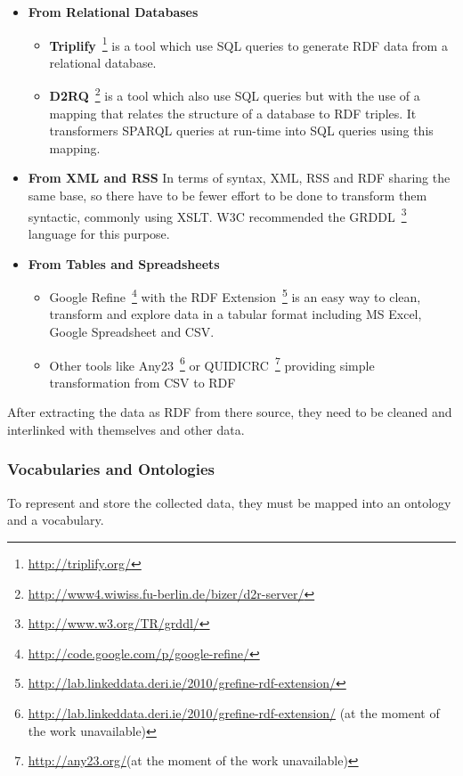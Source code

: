 {\begin{itemize}
	\item \textbf{From Relational Databases}
	\begin{itemize}
		\item \textbf{Triplify}~\footnote{\url{http://triplify.org/}} is a tool which use SQL queries to generate RDF data from a relational database.
		\item \textbf{D2RQ}~\footnote{\url{http://www4.wiwiss.fu-berlin.de/bizer/d2r-server/}} is a tool which also use SQL queries but with the use of a mapping that relates the structure of a database to RDF triples. It transformers SPARQL queries at run-time into SQL queries using this mapping.
	\end{itemize}
	\item \textbf{From XML and RSS}\newline
	In terms of syntax, XML, RSS and RDF sharing the same base, so there have to be fewer effort to be done to transform them syntactic, commonly using XSLT. W3C recommended the GRDDL~\footnote{\url{http://www.w3.org/TR/grddl/}} language for this purpose.
	\item \textbf{From Tables and Spreadsheets}
	\begin{itemize}
		\item Google Refine~\footnote{\url{http://code.google.com/p/google-refine/}} with the RDF Extension~\footnote{\url{http://lab.linkeddata.deri.ie/2010/grefine-rdf-extension/}} is an easy way to clean, transform and explore data in a tabular format including MS Excel, Google Spreadsheet and CSV.
		\item Other tools like Any23~\footnote{\url{http://lab.linkeddata.deri.ie/2010/grefine-rdf-extension/} (at the moment of the work unavailable)} or QUIDICRC~\footnote{\url{http://any23.org/}(at the moment of the work unavailable)} providing simple transformation from CSV to RDF
	\end{itemize}
\end{itemize}

After extracting the data as RDF from there source, they need to be cleaned and interlinked with themselves and other data.

\subsubsection{Vocabularies and Ontologies}\label{subsubsec:ontologies}
To represent and store the collected data, they must be mapped into an ontology and a vocabulary.

}
